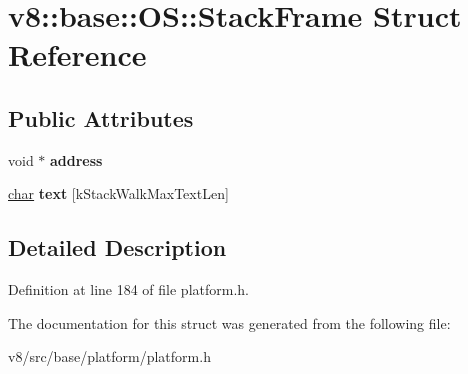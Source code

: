 \hypertarget{structv8_1_1base_1_1OS_1_1StackFrame}{}\section{v8\+:\+:base\+:\+:OS\+:\+:Stack\+Frame Struct Reference}
\label{structv8_1_1base_1_1OS_1_1StackFrame}
\subsection*{Public Attributes}
\begin{DoxyCompactItemize}
\item 
\mbox{\label{structv8_1_1base_1_1OS_1_1StackFrame_a65b50acc3996576011bcd572b75c20de}} 
void $\ast$ {\bfseries address}
\item 
\mbox{\label{structv8_1_1base_1_1OS_1_1StackFrame_a088cd084d2b014debcf372ca326b31f4}} 
\mbox{\hyperlink{classchar}{char}} {\bfseries text} \mbox{[}k\+Stack\+Walk\+Max\+Text\+Len\mbox{]}
\end{DoxyCompactItemize}


\subsection{Detailed Description}


Definition at line 184 of file platform.\+h.



The documentation for this struct was generated from the following file\+:\begin{DoxyCompactItemize}
\item 
v8/src/base/platform/platform.\+h\end{DoxyCompactItemize}
